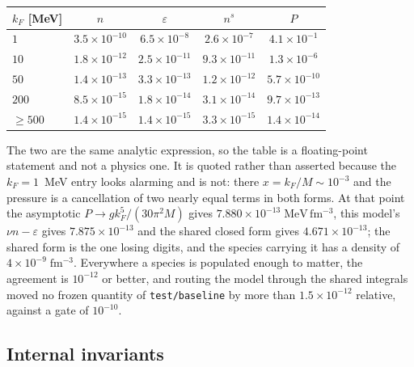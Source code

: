 \documentclass[aps,prc,onecolumn,superscriptaddress,nofootinbib,10pt]{revtex4-2}
\newcommand{\kF}{k_F}
\begin{document}
\begin{center}
\begin{tabular}{lcccc}
\toprule
$\kF$ [MeV] & $n$ & $\varepsilon$ & $n^s$ & $P$ \\
\midrule
$1$    & $3.5\times10^{-10}$ & $6.5\times10^{-8}$  & $2.6\times10^{-7}$  & $4.1\times10^{-1}$ \\
$10$   & $1.8\times10^{-12}$ & $2.5\times10^{-11}$ & $9.3\times10^{-11}$ & $1.3\times10^{-6}$ \\
$50$   & $1.4\times10^{-13}$ & $3.3\times10^{-13}$ & $1.2\times10^{-12}$ & $5.7\times10^{-10}$ \\
$200$  & $8.5\times10^{-15}$ & $1.8\times10^{-14}$ & $3.1\times10^{-14}$ & $9.7\times10^{-13}$ \\
$\ge 500$ & $1.4\times10^{-15}$ & $1.4\times10^{-15}$ & $3.3\times10^{-15}$ & $1.4\times10^{-14}$ \\
\bottomrule
\end{tabular}
\end{center}

\noindent
The two are the same analytic expression, so the table is a floating-point
statement and not a physics one. It is quoted rather than asserted because the
$\kF = 1$~MeV entry looks alarming and is not: there $x = \kF/M \sim 10^{-3}$
and the pressure is a cancellation of two nearly equal terms in both forms.
At that point the asymptotic $P \to g\kF^5/(30\pi^2 M)$ gives
$7.880\times10^{-13}\;\mathrm{MeV\,fm^{-3}}$, this model's
$\nu n - \varepsilon$ gives $7.875\times10^{-13}$ and the shared closed form
gives $4.671\times10^{-13}$; the shared form is the one losing digits, and the
species carrying it has a density of $4\times10^{-9}\;\mathrm{fm^{-3}}$.
Everywhere a species is populated enough to matter, the agreement is
$10^{-12}$ or better, and routing the model through the shared integrals moved
no frozen quantity of \texttt{test/baseline} by more than
$1.5\times10^{-12}$ relative, against a gate of $10^{-10}$.

\subsection{Internal invariants}
\end{document}
